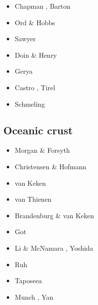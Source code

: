 \begin{scriptsize}
\begin{itemize}
\item[\nineteeneightysix] Chapman \cite{chap86}, Barton \cite{bart86}
\item[\nineteeneightynine] Ord \& Hobbs \cite{ord89}
\item[\nineteenninetyfour] Sawyer \cite{sawy94}
\item[\twothousandone] Doin \& Henry \cite{dohe01}
\item[\twothousandfour] Gerya \etal \cite{gepm04}
\item[\twothousandthirteen] Castro \etal \cite{cavg13}, Tirel \etal \cite{tibb13}
\item[\twothousandnineteen] Schmeling \etal \cite{scmw19}
\end{itemize}
\end{scriptsize}


\subsection{Oceanic crust} 

\begin{scriptsize}
\begin{itemize}
\item[\nineteeneightyeight] Morgan \& Forsyth \cite{mofo88}
\item[\nineteenninetyfour] Christensen \& Hofmann \cite{chho94}
\item[\nineteenninetysix] van Keken \etal \cite{vaky96}
\item[\twothousandfour] van Thienen \etal \cite{vavv04b}
\item[\twothousandseven] Brandenburg \& van Keken \cite{brva07b}
\item[\twothousandeight] Got \etal \cite{gomm08}
\item[\twothousandthirteen] Li \& McNamara \cite{limc13}, Yoshida \cite{yosh13}
\item[\twothousandfifteen] Ruh \etal \cite{rula15}
\item[\twothousandseventeen] Taposeea \etal \cite{taac17}
\item[\twothousandtwenty] Munch \etal \cite{mugu20}, Yan \etal \cite{yabt20}
\end{itemize}
\end{scriptsize}


